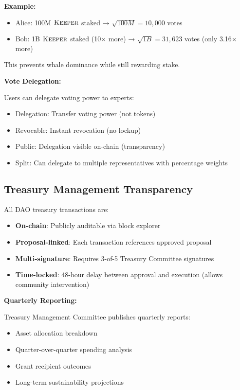 \documentclass[11pt,letterpaper]{article}
\theoremstyle{definition}
\theoremstyle{remark}
\newcommand{\KEEPER}{\textsc{Keeper}}
\begin{document}
\textbf{Example:}
\begin{itemize}
\item Alice: 100M $\KEEPER$ staked → $\sqrt{100M} = 10,000$ votes
\item Bob: 1B $\KEEPER$ staked (10× more) → $\sqrt{1B} = 31,623$ votes (only 3.16× more)
\end{itemize}

This prevents whale dominance while still rewarding stake.

\textbf{Vote Delegation:}

Users can delegate voting power to experts:
\begin{itemize}
\item Delegation: Transfer voting power (not tokens)
\item Revocable: Instant revocation (no lockup)
\item Public: Delegation visible on-chain (transparency)
\item Split: Can delegate to multiple representatives with percentage weights
\end{itemize}

\subsection{Treasury Management Transparency}

All DAO treasury transactions are:
\begin{itemize}
\item \textbf{On-chain}: Publicly auditable via block explorer
\item \textbf{Proposal-linked}: Each transaction references approved proposal
\item \textbf{Multi-signature}: Requires 3-of-5 Treasury Committee signatures
\item \textbf{Time-locked}: 48-hour delay between approval and execution (allows community intervention)
\end{itemize}

\textbf{Quarterly Reporting:}

Treasury Management Committee publishes quarterly reports:
\begin{itemize}
\item Asset allocation breakdown
\item Quarter-over-quarter spending analysis
\item Grant recipient outcomes
\item Long-term sustainability projections
\end{itemize}
\end{document}
